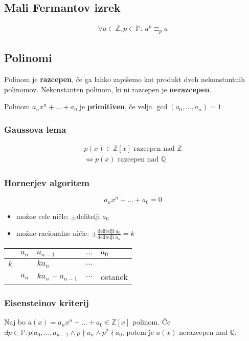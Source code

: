 \subsection*{Mali Fermantov izrek}
\begin{align*}
	\forall a \in \mathbb{Z}, p \in \mathbb{P}:\ a^p \equiv_p a
\end{align*}

\subsection*{Polinomi}
Polinom je \textbf{razcepen}, če ga lahko zapišemo kot produkt dveh nekonstantnih polinomov.
Nekonstanten polinom, ki ni razcepen je \textbf{nerazcepen}.

Polinom $a_n x^n + \dots + a_0$ je \textbf{primitiven}, če velja $\gcd(a_0, \dots, a_n) = 1$

\subsubsection*{Gaussova lema}
\begin{multline*}
	p(x) \in \mathbb{Z}[x] \text{ razcepen nad } \mathbb{Z} \\ \iff p(x) \text{ razcepen nad } \mathbb{Q}
\end{multline*}

\subsubsection*{Hornerjev algoritem}
\[a_n x^n + ... + a_0 = 0\]
\begin{itemize}
	\item možne cele ničle: $\pm$delitelji $a_0$
	\item možne racionalne ničle: $\pm \frac{\text{delitelji }a_0}{\text{delitelji }a_n} = k$
\end{itemize}
\begin{center}
	\begin{tabular}{ l|l l l l}
			& $a_n$ & $a_{n-1}$ & $...$ & $a_0$ \\ \hline
		$k$ &       & $ka_n$    & $...$ & \\ \hline
			& $a_n$ & $ka_n - a_{n-1}$ & $...$ & ostanek\\
	\end{tabular}
\end{center}

\subsubsection*{Eisensteinov kriterij}
Naj bo $a(x) = a_n x^n + \dots + a_0 \in \mathbb{Z}[x]$ polinom. Če $\exists p \in \mathbb{P} : p | a_0, \dots, a_{n-1} \wedge p \nmid a_n \wedge p^2 \nmid a_0$, potem je $a(x)$ nerazcepen nad $\mathbb{Q}$.

